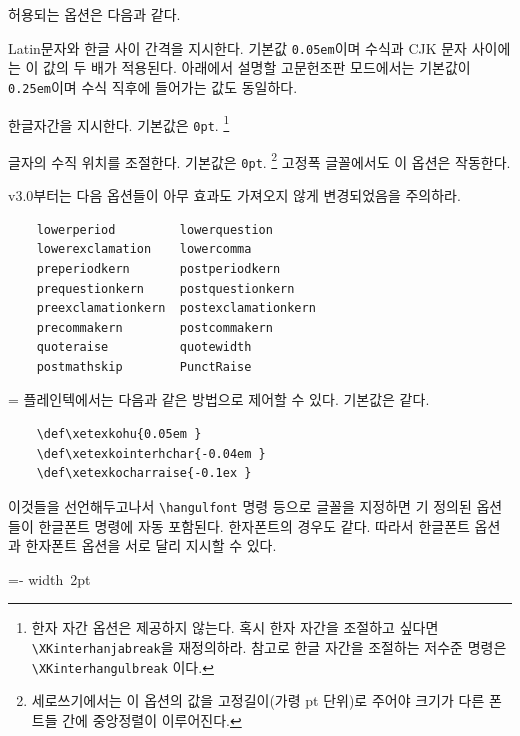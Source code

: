 \documentclass[a4paper]{article}
\def\grayvrule{{\color{white!80!black}\vrule width 2pt}}
\newenvironment{plaintex}
  {\par\medskip
    \setbox0=\vbox\bgroup\kern5pt\leftskip15pt \small
    \parindent0pt }
  {\par \kern5pt\egroup
    \dimen0=\dimexpr\pagegoal-\pagetotal\relax
    \ifdim\dimen0<\baselineskip\relax \dimen0\maxdimen \fi
    \ifdim\ht0<\dimen0
      \hbox{\grayvrule \box0}%
    \else
      \setbox2=\vsplit0 to\dimen0
      \lineskip0pt
      \ifvoid2 \else\hbox{\grayvrule \box2}\fi
      \ifvoid0 \else\hbox{\grayvrule \box0}\fi
    \fi \par\smallskip
  }
\newenvironment{oldstuff}
  {
    \par\smallskip
    \narrower\small\parindent0pt
  }
  {
    \par\smallskip
  }
\def\cs#1{\texttt{\textbackslash #1}}
\begin{document}
허용되는 옵션은 다음과 같다.
\begin{description}\itemsep0pt
\item[InterLatinCJK, hu]\quad
  { Latin문자와} 한글 사이 간격을 지시한다.
    기본값 \verb|0.05em|이며
    수식과 CJK 문자 사이에는 이 값의 두 배가 적용된다.
    아래에서 설명할 고문헌조판 모드에서는 기본값이 \verb|0.25em|이며
    수식 직후에 들어가는 값도 동일하다.

\item[InterHangul, interhchar]\quad
  { 한글자간을} 지시한다.
  기본값은 \verb|0pt|.%
  \footnote{한자 자간 옵션은 제공하지 않는다.
  혹시 한자 자간을 조절하고 싶다면 \cs{XKinterhanjabreak}을 재정의하라.
  참고로 한글 자간을 조절하는 저수준 명령은 \cs{XKinterhangulbreak} 이다.}

\item[CharRaise, charraise]\quad
  글자의 {수직 위치}를 조절한다.
  기본값은 \verb|0pt|.%
    \footnote{%
      세로쓰기에서는 이 옵션의 값을 고정길이(가령 pt 단위)로 주어야
      크기가 다른 폰트들 간에 중앙정렬이 이루어진다.
    }
  고정폭 글꼴에서도 이 옵션은 작동한다.
\end{description}
\begin{oldstuff}
v3.0부터는 다음 옵션들이 아무 효과도 가져오지 않게
변경되었음을 주의하라.
\begin{verbatim}
    lowerperiod         lowerquestion
    lowerexclamation    lowercomma
    preperiodkern       postperiodkern
    prequestionkern     postquestionkern
    preexclamationkern  postexclamationkern
    precommakern        postcommakern
    quoteraise          quotewidth
    postmathskip        PunctRaise
\end{verbatim}
\end{oldstuff}

\begin{plaintex}
  플레인텍에서는 다음과 같은 방법으로 제어할 수 있다. 기본값은  같다.
\begin{verbatim}
    \def\xetexkohu{0.05em }
    \def\xetexkointerhchar{-0.04em }
    \def\xetexkocharraise{-0.1ex }
\end{verbatim}
  이것들을 선언해두고나서 \cs{hangulfont} 명령 등으로 글꼴을
  지정하면 기 정의된 옵션들이 한글폰트 명령에 자동 포함된다.
  한자폰트의 경우도 같다. 따라서 한글폰트 옵션과
  한자폰트 옵션을 서로 달리 지시할 수 있다.
\end{plaintex}
\end{document}
